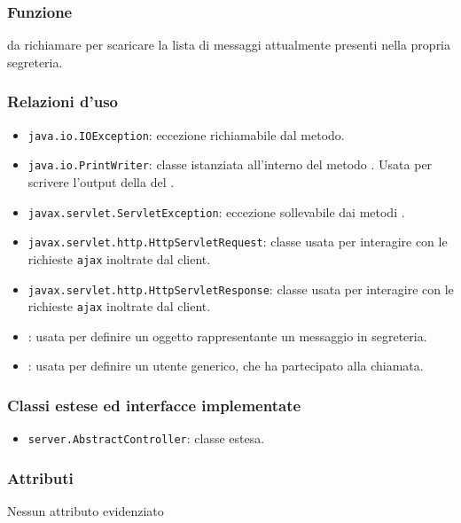 
\subsubsection*{Funzione}
 da richiamare per scaricare la lista di messaggi attualmente presenti nella propria segreteria.

\subsubsection*{Relazioni d'uso}
\begin{itemize}
	\item \texttt{java.io.IOException}: eccezione richiamabile dal metodo.
	\item \texttt{java.io.PrintWriter}: classe istanziata all'interno del metodo . Usata per scrivere l'output della del .
	\item \texttt{javax.servlet.ServletException}: eccezione sollevabile dai metodi .
	\item \texttt{javax.servlet.http.HttpServletRequest}: classe usata per interagire con le richieste \texttt{ajax} inoltrate dal client.
	\item \texttt{javax.servlet.http.HttpServletResponse}: classe usata per interagire con le richieste \texttt{ajax} inoltrate dal client.
	\item {}: usata per definire un oggetto rappresentante un messaggio in segreteria.
	\item {}: usata per definire un utente generico, che ha partecipato alla chiamata.
\end{itemize}

\subsubsection*{Classi estese ed interfacce implementate}
\begin{itemize}
	\item \texttt{server.AbstractController}: classe estesa.
\end{itemize}

\subsubsection*{Attributi}

Nessun attributo evidenziato

